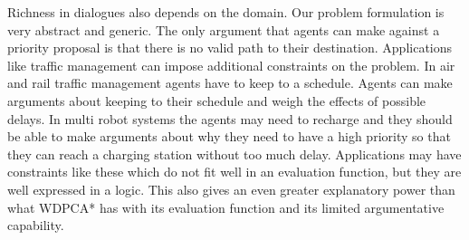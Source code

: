 Richness in dialogues also depends on the domain. Our problem formulation is
very abstract and generic. The only argument that agents can make against a
priority proposal is that there is no valid path to their destination.
Applications like traffic management can impose additional constraints on the
problem. In air and rail traffic management agents have to keep to a schedule.
Agents can make arguments about keeping to their schedule and weigh the effects 
of possible delays. In multi robot systems the
agents may need to recharge and they should be able to make arguments about why
they need to have a high priority so that they can reach a charging station
without too much delay. Applications may have constraints like these which do
not fit well in an evaluation function, but they are well expressed in a logic.
This also gives an even greater explanatory power than what WDPCA* has with its
evaluation function and its limited argumentative capability.

%    
%

